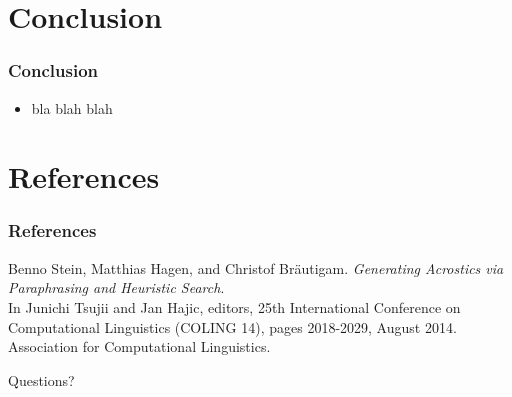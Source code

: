 \documentclass{beamer}
\begin{document}
\section{Conclusion}

\begin{frame}
\frametitle{Conclusion}
\begin{itemize}
\item bla blah blah
\end{itemize}
\end{frame}

\section{References}

\begin{frame}
\frametitle{References}
\footnotesize
\begin{thebibliography}{1}
	Benno Stein, Matthias Hagen, and Christof Bräutigam. \emph{Generating Acrostics via Paraphrasing and Heuristic Search}. \\
	In Junichi Tsujii and Jan Hajic, editors, 25th International Conference on Computational Linguistics (COLING 14), pages 2018-2029, August 2014. Association for Computational Linguistics.
\end{thebibliography}
\end{frame}

\begin{frame}
\Huge{\centerline{Questions?}}
\end{frame}

\end{document}

